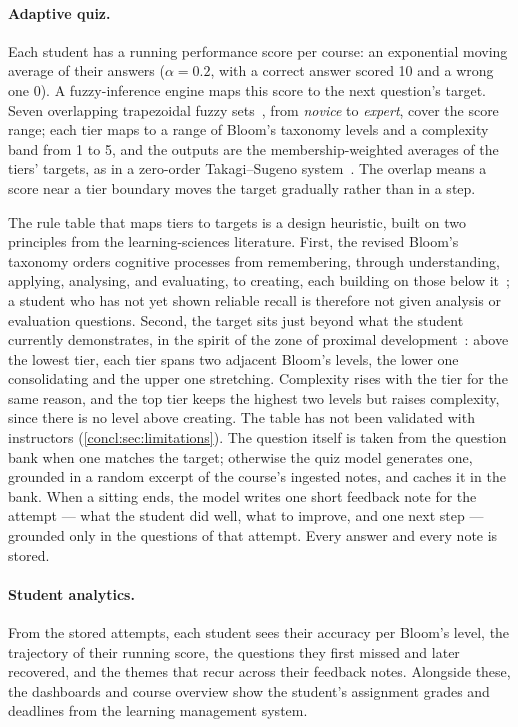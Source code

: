 \paragraph{Adaptive quiz.} Each student has a running performance score per
course: an exponential moving average of their answers ($\alpha = 0.2$, with
a correct answer scored 10 and a wrong one 0). A fuzzy-inference engine maps
this score to the next question's target. Seven overlapping trapezoidal
fuzzy sets~\cite{ic65:Zadeh}, from \emph{novice} to \emph{expert}, cover the
score range; each tier maps to a range of Bloom's taxonomy levels and a
complexity band from 1 to 5, and the outputs are the membership-weighted
averages of the tiers' targets, as in a zero-order Takagi--Sugeno
system~\cite{smc85:Takagi}. The overlap means a score near a tier boundary
moves the target gradually rather than in a step.

The rule table that maps tiers to targets is a design heuristic, built on two
principles from the learning-sciences literature. First, the revised Bloom's
taxonomy orders cognitive processes from remembering, through understanding,
applying, analysing, and evaluating, to creating, each building on those
below it~\cite{book01:Anderson}; a student who has not yet shown reliable
recall is therefore not given analysis or evaluation questions. Second, the
target sits just beyond what the student currently demonstrates, in the
spirit of the zone of proximal development~\cite{book78:Vygotsky}: above the
lowest tier, each tier spans two adjacent Bloom's levels, the lower one
consolidating and the upper one stretching. Complexity rises with the tier
for the same reason, and the top tier keeps the highest two levels but raises
complexity, since there is no level above creating. The table has not been
validated with instructors (\autoref{concl:sec:limitations}).
The question itself is taken from the question bank when one matches the
target; otherwise the quiz model generates one, grounded in a random excerpt
of the course's ingested notes, and caches it in the bank. When a sitting
ends, the model writes one short feedback note for the attempt --- what the
student did well, what to improve, and one next step --- grounded only in
the questions of that attempt. Every answer and every note is stored.

\paragraph{Student analytics.} From the stored attempts, each student sees
their accuracy per Bloom's level, the trajectory of their running score, the
questions they first missed and later recovered, and the themes that recur
across their feedback notes. Alongside these, the dashboards and course
overview show the student's assignment grades and deadlines from the
learning management system.

